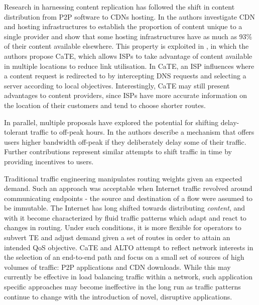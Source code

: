Research in harnessing content replication has followed the shift in content distribution from \ac{P2P} software to \acp{CDN} hosting.
In \cite{Ager:2011p528} the authors investigate CDN and hosting infrastructures to establish the proportion of content unique to a single provider and show that some hosting infrastructures have as much as 93\% of their content available elsewhere.
This property is exploited in \cite{Frank:2012p533}, in which the authors propose \ac{CaTE}, which allows \acp{ISP} to take advantage of content available in multiple locations to reduce link utilisation. 
In \ac{CaTE}, an \ac{ISP} influences where a content request is redirected to by intercepting \ac{DNS} requests and selecting a server according to local objectives.
Interestingly, \ac{CaTE} may still present advantages to content providers, since \acp{ISP} have more accurate information on the location of their customers and tend to choose shorter routes.

In parallel, multiple proposals have explored the potential for shifting delay-tolerant traffic to off-peak hours.
In \cite{Laoutaris:2008p534} the authors describe a mechanism that offers users higher bandwidth off-peak if they deliberately delay some of their traffic.
Further contributions \cite{JoeWong:2011p535,Chhabra:2010p536} represent similar attempts to shift traffic in time by providing incentives to users.

Traditional traffic engineering manipulates routing weights given an expected demand.
Such an approach was acceptable when Internet traffic revolved around communicating endpoints - the source and destination of a flow were assumed to be immutable.
The Internet has long shifted towards distributing \emph{content}, and with it become characterized by fluid traffic patterns which adapt and react to changes in routing.
Under such conditions, it is more flexible for operators to subvert \ac{TE} and adjust demand given a set of routes in order to attain an intended \ac{QoS} objective.
\ac{CaTE} and \ac{ALTO} attempt to reflect network interests in the selection of an end-to-end path and focus on a small set of sources of high volumes of traffic: \ac{P2P} applications and \ac{CDN} downloads.
While this may currently be effective in load balancing traffic within a network, such application specific approaches may become ineffective in the long run as traffic patterns continue to change with the introduction of novel, disruptive applications.
